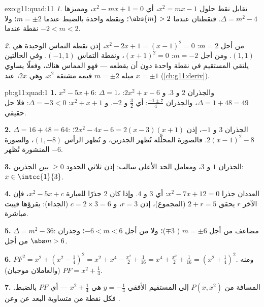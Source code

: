 \begin{solution}{exo:g11:quad:11}
\emph{1.} تقابل نقط  حلول $x^2 = mx - 1$، أي
$x^2 - mx + 1 = 0$، ومميزها $\Delta = m^2 - 4$. فنقطتان
عندما $\abs{m} > 2$؛ ونقطة واحدة بالضبط عندما $m = \pm 2$؛ ولا نقطة عندما $-2 < m < 2$.

\emph{2.} من أجل $m = 2$: $x^2 - 2x + 1 = (x-1)^2 = 0$، إذن نقطة التماس
الوحيدة هي $(1, 1)$. ومن أجل $m = -2$: $(x+1)^2 = 0$، ونقطة التماس $(-1, 1)$.
وفي الحالتين يلتقي المستقيم  في نقطة واحدة دون
أن يقطعه --- فهو المماس هناك، وفعلًا يساوي ميله $m = \pm 2$
قيمة مشتقة $x^2$، وهي $2x$، عند $x = \pm 1$
(\cref{ch:g11:deriv}).
\end{solution}

\begin{solution}{pb:g11:quad:1}
\textbf{1.} $x^2 - 5x + 6$: $\Delta = 1$، والجذران $2$ و $3$.
و $2x^2 + x - 6$: $\Delta = 1 + 48 = 49$، والجذران
$\frac{-1 \pm 7}{4}$: أي $\frac32$ و $-2$. و $x^2 + x + 1$:
$\Delta = -3 < 0$: فلا حل حقيقي.

\textbf{2.} $\Delta = 16 + 48 = 64$: الجذران $3$ و $-1$، إذن
$2x^2 - 4x - 6 = 2(x - 3)(x + 1)$؛ 
$2(x - 1)^2 - 8$. فالصورة المحلَّلة تُظهر الجذرين، و
 تُظهر الرأس $(1, -8)$، والصورة المنشورة تُظهر
 $-6$.

\textbf{3.} الجذران $1$ و $3$، ومعامل الحد الأعلى سالب:
إذن ثلاثي الحدود $\geq 0$ \emph{بين} الجذرين:
$x \in \intcc{1}{3}$.

\textbf{4.} العددان جذرا $x^2 - 7x + 12 = 0$:
أي $3$ و $4$. وإذا كان $2$ جذرًا للعبارة $x^2 - 5x + c$، فإن  الآخر
$r$ يحقق $2 + r = 5$ (المجموع)، إذن $r = 3$، و
$c = 2 \times 3 = 6$ (الجداء): يقرؤها فييت مباشرة.

\textbf{5.} $\Delta = m^2 - 36$:  مضاعف من أجل $m = \pm 6$
( $\mp 3$)؛ ولا  من أجل $-6 < m < 6$؛ وجذران من أجل
$\abs m > 6$.

\textbf{6.} $PF^2 = x^2 + \left(x^2 - \frac14\right)^2
= x^2 + x^4 - \frac{x^2}{2} + \frac{1}{16}
= x^4 + \frac{x^2}{2} + \frac{1}{16}
= \left(x^2 + \frac14\right)^2$. ومنه
$PF = x^2 + \frac14$ (والعاملان موجبان).

\textbf{7.} المسافة من $P(x, x^2)$ إلى المستقيم الأفقي
$y = -\frac14$ هي $x^2 + \frac14$ --- أي $PF$ بالضبط. فكل
نقطة من  متساوية البعد عن  وعن
.


\end{solution}
